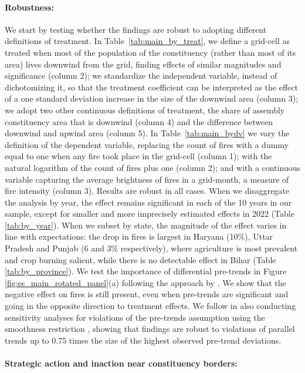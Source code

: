 \documentclass[12pt]{article}
\begin{document}
 \paragraph{Robustness:} We start by testing whether the findings are robust to adopting different definitions of treatment. In Table~\ref{tab:main_by_treat}, we define a grid-cell as treated when most of the population of the constituency (rather than most of its area) lives downwind from the grid, finding effects of similar magnitudes and significance (column 2); we standardize the independent variable, instead of dichotomizing it, so that the treatment coefficient can be interpreted as the effect of a one standard deviation increase in the size of the downwind area (column 3); we adopt two other continuous definitions of treatment, the share of assembly constituency area that is downwind (column 4) and the difference between downwind and upwind area (column 5). In Table~\ref{tab:main_bydv} we vary the definition of the dependent variable, replacing the count of fires with a dummy equal to one when any fire took place in the grid-cell (column 1); with the natural logarithm of the count of fires plus one (column 2); and with a continuous variable capturing the average brightness of fires in a grid-month, a measure of fire intensity (column 3). Results are robust in all cases. When we disaggregate the analysis by year, the effect remains significant in each of the 10 years in our sample, except for smaller and more imprecisely estimated effects in 2022 (Table \ref{tab:by_year}). When we subset by state, the magnitude of the effect varies in line with expectations: the drop in fires is largest in Haryana (10\%), Uttar Pradesh and Punjab (6 and 3\% respectively), where agriculture is most prevalent and crop burning salient, while there is  no detectable effect in Bihar (Table \ref{tab:by_province}).
 We test the importance of differential pre-trends in Figure \ref{fig:es_main_rotated_panel}(a) following the approach by \citet{dustmann2022reallocation}. We show that the negative effect on fires is still present, even when pre-trends are significant and going in the opposite direction to treatment effects. We follow \citet{dustmann2022reallocation} in also conducting sensitivity analyses for violations of the pre-trends assumption using the smoothness restriction \citep{rambachan2023more}, showing that findings are robust to violations of parallel trends up to 0.75 times the size of the highest observed pre-trend deviations.

 \paragraph{Strategic action and inaction near constituency borders:}
\end{document}
